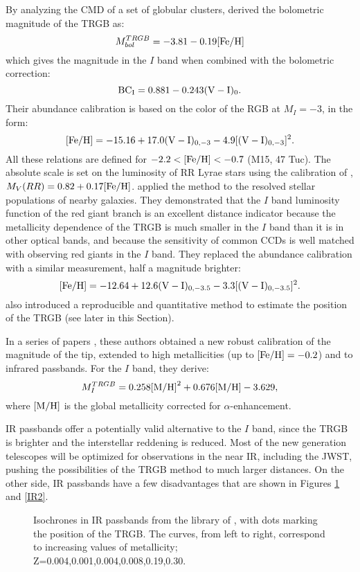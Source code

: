 \documentclass[11pt,preprint2]{aastex}
\begin{document}
By analyzing the CMD of a set of globular clusters, \cite{1990AJ....100..162D} derived the bolometric magnitude of the TRGB as:
$$ M_{bol}^{TRGB}=-3.81-0.19\rm{[Fe/H]}$$
which gives the magnitude in the $I$ band when combined with the bolometric correction:
$$ \rm{BC_I}=0.881-0.243(V-I)_0. $$
Their abundance calibration is based on the color of the RGB at $M_I = -3$, in the form:
$$ \rm{[Fe/H]}=-15.16 + 17.0 (V-I)_{0,-3}-4.9[(V-I)_{0,-3}]^2. $$ 
All these relations are defined for $-2.2 < \rm{[Fe/H]} < -0.7$ (M15, 47 Tuc).
The absolute scale is set on the luminosity of RR Lyrae stars using the calibration of  \cite{1990ApJ...350..155L}, $M_V(RR)=0.82 + 0.17 \rm{[Fe/H]}$. 
\citet{1993ApJ...417..553L} applied the method to the resolved stellar populations of nearby galaxies.
They demonstrated that the $I$ band luminosity function of the red giant branch is an excellent distance indicator because the metallicity dependence of the TRGB is much smaller in the $I$ band than it is in other optical bands, and because the sensitivity of common CCDs is well matched with observing red giants in the $I$ band.
They replaced the abundance calibration with a similar measurement, half a magnitude brighter:
$$ \rm{[Fe/H]}=-12.64 + 12.6 (V-I)_{0,-3.5}-3.3[(V-I)_{0,-3.5}]^2.$$
\citet{1993ApJ...417..553L} also introduced a reproducible and quantitative method to estimate the position of the TRGB (see later in this Section). 

In a series of papers \citep{1999AJ....118.1738F, 2000AJ....119.1282F, 2001ApJ...556..635B,
2004AA...424..199B}, these authors obtained a new robust calibration of the magnitude of the tip, extended to high metallicities (up to $\rm{[Fe/H]} = -0.2$) and to infrared passbands. For the $I$ band, they derive:
$$ M_I^{TRGB}=0.258 \rm{[M/H]}^2 + 0.676 \rm{[M/H]} -3.629, $$
where $\rm{[M/H]}$ is the global metallicity corrected for $\alpha$-enhancement.

IR passbands offer a potentially valid alternative to the $I$ band, since the TRGB is brighter and the interstellar reddening is reduced. Most of the new generation telescopes will be optimized for observations in the near IR, including the JWST, pushing the possibilities of the TRGB method to much larger distances. On the other side, IR passbands have a few disadvantages that are shown in Figures \ref{IR1} and \ref{IR2}. 
\begin{figure}
\caption{Isochrones in IR passbands from the library of \citet{2002AA...391..195G}, with dots marking the position of the TRGB. The curves, from left to right, correspond to increasing values of metallicity; Z=0.004,0.001,0.004,0.008,0.19,0.30.}
\label{IR1}
\end{figure}
\end{document}
